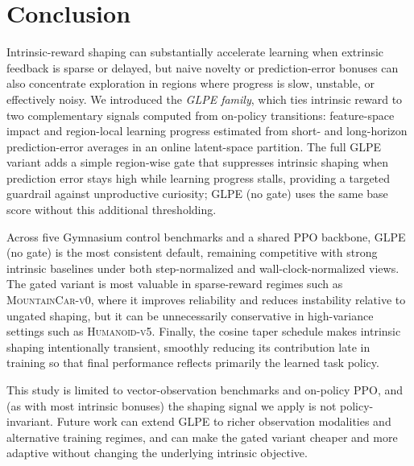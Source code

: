\section{Conclusion}
\label{sec:conclusion}

Intrinsic-reward shaping can substantially accelerate learning when extrinsic feedback is sparse or delayed, but naive novelty or prediction-error bonuses can also concentrate exploration in regions where progress is slow, unstable, or effectively noisy.
We introduced the \emph{GLPE family}, which ties intrinsic reward to two complementary signals computed from on-policy transitions: feature-space impact and region-local learning progress estimated from short- and long-horizon prediction-error averages in an online latent-space partition.
The full GLPE variant adds a simple region-wise gate that suppresses intrinsic shaping when prediction error stays high while learning progress stalls, providing a targeted guardrail against unproductive curiosity; GLPE (no gate) uses the same base score without this additional thresholding.

Across five Gymnasium control benchmarks and a shared PPO backbone, GLPE (no gate) is the most consistent default, remaining competitive with strong intrinsic baselines under both step-normalized and wall-clock-normalized views.
The gated variant is most valuable in sparse-reward regimes such as \textsc{MountainCar-v0}, where it improves reliability and reduces instability relative to ungated shaping, but it can be unnecessarily conservative in high-variance settings such as \textsc{Humanoid-v5}.
Finally, the cosine taper schedule makes intrinsic shaping intentionally transient, smoothly reducing its contribution late in training so that final performance reflects primarily the learned task policy.

This study is limited to vector-observation benchmarks and on-policy PPO, and (as with most intrinsic bonuses) the shaping signal we apply is not policy-invariant.
Future work can extend GLPE to richer observation modalities and alternative training regimes, and can make the gated variant cheaper and more adaptive without changing the underlying intrinsic objective.
